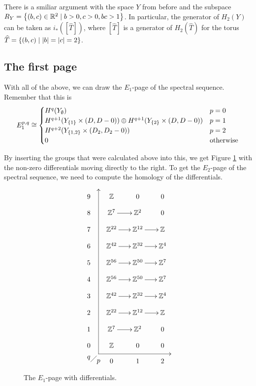 There is a smiliar argument with the space $Y$ from before and the
subspace $R_Y = \left\{ (b,c) \in \mathbb{R}^2 \mid b > 0, c > 0, bc > 1 \right\}$. In
particular, the generator of $H_2(Y)$ can be taken as
$i_*\left([\widehat T]\right)$, where $[\widehat
  T]$ is a generator of $H_2(\widehat T)$ for the torus $\widehat T =
  \left\{ (b,c)\mid \left| b \right|=\left| c \right| = 2 \right\}$.

\subsection{The first page}

With all of the above, we can draw the $E_1$-page of the spectral
sequence. Remember that this is
\[ E_1^{p,q} \cong
\begin{cases}
  H^{q}(Y_\emptyset) & p=0 \\
  H^{q+1}(Y_{\left\{ 1 \right\}} \times (D,D-0)) \oplus H^{q+1}(Y_{\left\{ 2 \right\}} \times
  (D,D-0)) & p=1 \\
  H^{q+2}(Y_{\left\{ 1,2 \right\}}\times (D_2,D_2-0)) & p = 2 \\
  0 & \text{otherwise}
\end{cases} \]

By inserting the groups that were calculated above into this, we get
Figure \ref{e1} with the non-zero differentials moving directly to
the right. To get the $E_2$-page of the spectral sequence, we need to
compute the homology of the differentials.

\begin{figure}[ht]
  \[ \xy
  (5,4); (5,-80); **\dir{-}; (5,4); *\dir{>};
  (5,-80); (42,-80); **\dir{-}; *\dir{<};
  (0,-82)*{q}; (5,-84)*{p};
  (1,-84); (4,-81); **\dir{-};
  (0,0)\xymatrix@R=1em@C=1.7em{
    9 & \Z & 0 & 0 \\
    8 & \Z^7 \ar[r]& \Z^2 & 0 \\
    7 & \Z^{22} \ar[r]& \Z^{12} \ar[r]& \Z \\
    6 & \Z^{42} \ar[r]& \Z^{32} \ar[r]& \Z^{4} \\
    5 & \Z^{56} \ar[r]& \Z^{50} \ar[r]& \Z^{7} \\
    4 & \Z^{56} \ar[r]& \Z^{50} \ar[r]& \Z^{7} \\
    3 & \Z^{42} \ar[r]& \Z^{32} \ar[r]& \Z^{4} \\
    2 & \Z^{22} \ar[r]& \Z^{12} \ar[r]& \Z \\
    1 & \Z^{7} \ar[r]& \Z^{2} & 0 \\
    0 & \Z & 0 & 0 \\
    & 0 & 1 & 2
  } \endxy \]
  \caption{The $E_1$-page with differentials.}
  \label{e1}
\end{figure}

